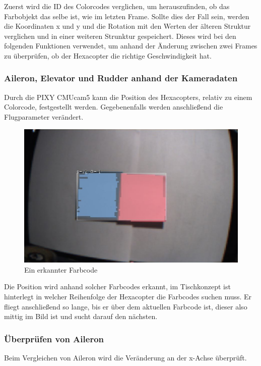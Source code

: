     Zuerst wird die ID des Colorcodes verglichen, um herauszufinden, ob das Farbobjekt das selbe ist, wie im letzten Frame.
    Sollte dies der Fall sein, werden die Koordinaten x und y und die Rotation mit den Werten der älteren Struktur verglichen und in einer weiteren Strunktur gespeichert. Dieses wird bei den folgenden Funktionen verwendet, um anhand der Änderung zwischen zwei Frames zu überprüfen, ob der Hexacopter die richtige Geschwindigkeit hat.

    \subsubsection{Aileron, Elevator und Rudder anhand der Kameradaten}
    Durch die PIXY CMUcam5 kann die Position des Hexacopters, relativ zu einem Colorcode, festgestellt werden. Gegebenenfalls werden anschließend die Flugparameter verändert.

    \begin{figure} [tbh]
      \begin{centering}
        \includegraphics[width = \textwidth]{Bilder/Farbcode_erkannt}
      \par\end{centering}
      \caption{Ein erkannter Farbcode}
      \label{Farbcode_erkannt}
    \end{figure}
    Die Position wird anhand solcher Farbcodes erkannt, im Tischkonzept ist hinterlegt in welcher Reihenfolge der Hexacopter die Farbcodes suchen muss.
    Er fliegt anschließend so lange, bis er über dem aktuellen Farbcode ist, dieser also mittig im Bild ist und sucht darauf den nächsten.

    \subsubsection{Überprüfen von Aileron}
    Beim Vergleichen von Aileron wird die Veränderung an der x-Achse überprüft.


